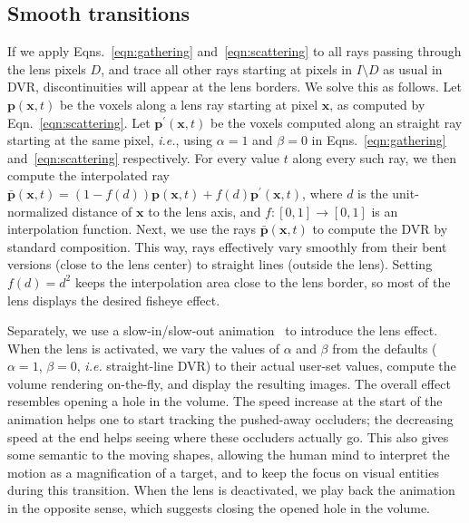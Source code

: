 \subsection{Smooth transitions}
\label{continuity}
%
If we apply Eqns.~\ref{eqn:gathering} and~\ref{eqn:scattering} to all rays passing through the lens pixels $D$, and trace all other rays starting at pixels in $I \setminus D$ as usual in DVR, discontinuities will appear at the lens borders. We solve this as follows. Let $\mathbf{p}(\mathbf{x},t)$ be the voxels along a lens ray starting at pixel $\mathbf{x}$, as computed by Eqn.~\ref{eqn:scattering}. Let $\mathbf{p}^{\prime}(\mathbf{x},t)$ be the voxels computed along an straight ray starting at the same pixel, \emph{i.e.}, using $\alpha=1$ and $\beta=0$ in Eqns.~\ref{eqn:gathering} and~\ref{eqn:scattering} respectively. For every value $t$ along every such ray, we then compute the interpolated ray
$\bar{\mathbf{p}}(\mathbf{x},t) = (1-f(d))\mathbf{p}(\mathbf{x},t) + f(d)\mathbf{p}^{\prime}(\mathbf{x},t)$, where $d$ is the unit-normalized distance of $\mathbf{x}$ to the lens axis, and $f : [0,1] \rightarrow [0,1]$ is an interpolation function. Next, we use the rays $\bar{\mathbf{p}}(\mathbf{x},t)$ to compute the DVR by standard composition. This way, rays effectively vary smoothly from their bent versions (close to the lens center) to straight lines (outside the lens). Setting $f(d) = d^2$ keeps the interpolation area close to the lens border, so most of the lens displays the desired fisheye effect.

Separately, we use a slow-in/slow-out animation~\cite{Dragicevic:2011:TDA:1978942.1979233} to introduce the lens effect. When the lens is activated, we vary the values of $\alpha$ and $\beta$ from the defaults ($\alpha=1$, $\beta=0$, \emph{i.e.} straight-line DVR) to their actual user-set values, compute the volume rendering on-the-fly, and display the resulting images. The overall effect resembles opening a hole in the volume. The speed increase at the start of the animation helps one to start tracking the pushed-away occluders; the decreasing speed at the end helps seeing where these occluders actually go. This also gives some semantic to the moving shapes, allowing the human mind to interpret the motion as a magnification of a target, and to keep the focus on visual entities during this transition. When the lens is deactivated, we play back the animation in the opposite sense, which suggests closing the opened hole in the volume.

